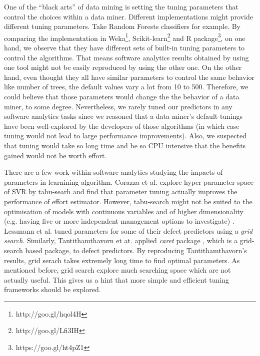 
One of the ``black arts'' of data mining is setting the tuning
parameters that control the choices within a data miner. Different implementations might
provide different tuning parameters. Take Random Forests classifiers for example. By comparing the implementation in Weka\footnote{http://goo.gl/hqol4H}, 
Scikit-learn\footnote{http://goo.gl/Lfi3IH} and R package\footnote{https://goo.gl/ht4pZ1}, on one hand, we observe that they have different sets of built-in tuning parameters to control the algorithms. That means software analytics results obtained by
using one tool might not be easily reproduced by using the other one.
On the other hand, even thought they all have similar parameters to control the same behavior like number of trees,
the default values vary a lot from 10 to 500. Therefore, we could believe that those parameters would change
the the behavior of a data miner, to some degree. Nevertheless, we rarely tuned our predictors in
any software analytics tasks since we reasoned that a data miner's default tunings have been 
well-explored by the developers of those algorithms (in which case
tuning would not lead to large performance improvements). Also, we suspected that
tuning would take so long time and be so CPU intensive that the benefits gained would not be worth effort.

There are  a few work within software analytics studying 
the impacts of parameters in learnining algorithm. Corazza et al.\cite{corazza2010effective} explore hyper-parameter space of SVR by tabu-searh and find that parameter tuning
actually improves the performance of effort estimator. However, tabu-search might not be suited to the optimisation of models with continuous variables and of higher dimensionality (e.g. having five or more independent management options to investigate) \cite{mayer1998tabu}. Lessmann et al.\cite{lessmann2008benchmarking} tuned parameters for some of their defect predictors using  a {\em grid search}. Similarly, Tantithamthavorn et at.\cite{tantithamthavorn2016automated} applied {\em caret} package \cite{kuhn2008caret}, which is a grid-search based package,  to defect predictors. By reproducing Tantithamthavorn's results, grid serach
takes extremely long time to find optimal parameters. As mentioned before, grid search explore much searching space which
are not actually useful. This gives
 us a hint that  more simple and efficient tuning
 frameworks should be explored.

